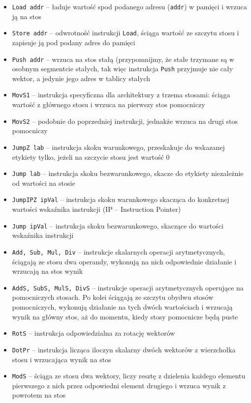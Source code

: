 \begin{itemize}
  \item \texttt{Load addr} -- ładuje wartość spod podanego adresu (\texttt{addr}) w pamięci i wrzuca ją na stos
  \item \texttt{Store addr} -- odwrotność instrukcji \texttt{Load}, ściąga wartość ze szczytu stosu i zapisuje ją pod podany adres do pamięci
  \item \texttt{Push addr} -- wrzuca na stos stałą (przypomnijmy, że stałe trzymane są w osobnym segmentcie stałych, tak więc instrukcja \texttt{Push} przyjmuje nie cały wektor, a jedynie jego adres w tablicy stałych
  \item \texttt{MovS1} -- instrukcja specyficzna dla architektury z trzema stosami: ściąga wartość z głównego stosu i wrzuca na pierwszy stos pomocniczy
  \item \texttt{MovS2} -- podobnie do poprzedniej instrukcji, jednakże wrzuca na drugi stos pomocniczy
  \item \texttt{JumpZ lab} -- instrukcja skoku warunkowego, przeskakuje do wskazanej etykiety tylko, jeżeli na szczycie stosu jest wartość 0
  \item \texttt{Jump lab} -- instrukcja skoku bezwarunkowego, skacze do etykiety niezależnie od wartości na stosie
  \item \texttt{JumpIPZ ipVal} -- instrukcja skoku warunkowego skacząca do konkretnej wartości wskaźnika instrukcji (IP -- Instruction Pointer)
  \item \texttt{Jump ipVal} -- instrukcja skoku bezwarunkowego, skaczące do wartości wskaźnika instrukcji
  \item \texttt{Add, Sub, Mul, Div} -- instrukcje skalarnych operacji arytmetycznych, ściągają ze stosu dwa operandy, wykonują na nich odpowiednie działanie i wrzucają na stos wynik
  \item \texttt{AddS, SubS, MulS, DivS} -- instrukcje operacji arytmetycznych operujące na pomocniczych stosach. Po kolei ściągają ze szczytu obydwu stosów pomocniczych, wykonują działanie na tych dwóch wartościach i wrzucają wynik na główny stos, aż do momentu, kiedy stosy pomocnicze będą puste
  \item \texttt{RotS} -- instrukcja odpowiedzialna za rotację wektorów
  \item \texttt{DotPr} -- instrukcja licząca iloczyn skalarny dwóch wektorów z wierzchołka stosu i wrzucająca wynik na stos
  \item \texttt{ModS} -- ściąga ze stosu dwa wektory, liczy resztę z dzielenia każdego elementu pierwszego z nich przez odpowiedni element drugiego i wrzuca wynik z powrotem na stos
\end{itemize}


